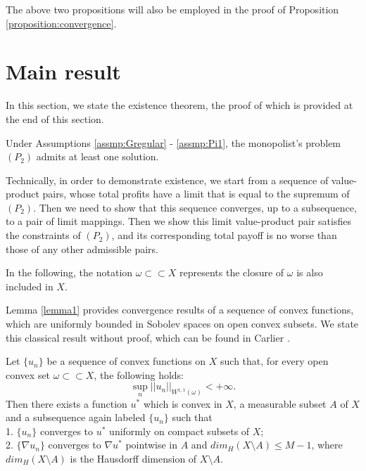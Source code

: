


The above two propositions will also be employed in the proof of Proposition \ref{proposition:convergence}. 

\bigskip







\section{Main result}\label{section:mainresult}
In this section, we state the existence theorem, the proof of which is provided at the end of this section.


\begin{theorem}[Existence]
	Under Assumptions \ref{assmp:Gregular} - \ref{assmp:Pi1}, the monopolist's problem $(P_2)$ admits at least one solution.
\end{theorem}

Technically, in order to demonstrate existence, we start from a sequence of value-product pairs, whose total profits have a limit that is equal to the supremum of $(P_2)$.
Then we need to show that this sequence converges, up to a subsequence, to a pair of limit mappings. Then we show this limit value-product pair satisfies the constraints of $(P_2)$, and its corresponding total payoff is no worse than those of any other admissible pairs. \medskip


In the following, the notation $\omega \subset \subset X$ represents the closure of $\omega$ is also included in $X$.\medskip

Lemma \ref{lemma1} provides convergence results of a sequence of convex functions, which are uniformly bounded in Sobolev spaces on open convex subsets. We state this classical result without proof, which can be found in Carlier \cite{Carlier01}.\medskip


\begin{lemma}\label{lemma1}
	Let $\{u_n\}$ be a sequence of convex functions on $X$ such that, for every open convex set $\omega \subset \subset X$, the following holds:
	\begin{equation*}
	\sup\limits_{n} ||u_n||_{W^{1,1}(\omega)} < +\infty.
	\end{equation*}
	Then there exists a function $u^*$ %
	which is convex in $X$, a measurable subset $A$ of $X$ and a subsequence again labeled $\{u_n\}$ such that\\
	1. $\{u_n\}$ converges to $u^*$ uniformly on compact subsets of $X$;\\
	2. $\{\nabla u_n\}$ converges to $\nabla u^*$ pointwise in $A$ and $dim_{H}(X\setminus A)\le M-1$, where $dim_{H}(X\setminus A)$ is the Hausdorff dimension of $X\setminus A$.
\end{lemma}

